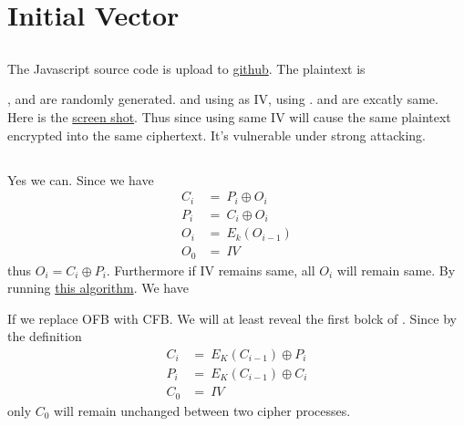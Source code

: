 \documentclass{article}
\begin{document}
\section{Initial Vector}
\subsection{}
The Javascript source code is upload to
\href{https://github.com/Luna1996/WUSTL/blob/master/571/L2/task41.js}{github}.
The plaintext is
\begin{center}
\end{center}
,  and  are randomly generated.  and  using  as IV,  using .  and  are excatly same. Here is the \href{https://i.loli.net/2018/09/25/5ba9b6889cf97.png}{screen shot}. Thus since using same IV will cause the same plaintext encrypted into the same ciphertext. It's vulnerable under strong attacking.
\subsection{}
Yes we can. Since we have
$$
	\begin{aligned}
		C_i & =\ P_i\oplus O_i \\
		P_i & =\ C_i\oplus O_i \\
		O_i & =\ E_k(O_{i-1})  \\
		O_0 & =\ IV
	\end{aligned}
$$
thus $O_i = C_i\oplus P_i$. Furthermore if IV remains same, all $O_i$ will remain same. By running \href{https://github.com/Luna1996/WUSTL/blob/master/571/L2/task42.js}{this algorithm}. We have
\begin{center}
\end{center}
If we replace OFB with CFB. We will at least reveal the first bolck of . Since by the definition
$$
	\begin{aligned}
		C_i & =\ E_K(C_{i-1})\oplus P_i \\
		P_i & =\ E_K(C_{i-1})\oplus C_i \\
		C_0 & =\ IV
	\end{aligned}
$$
only $C_0$ will remain unchanged between two cipher processes.
\end{document}
